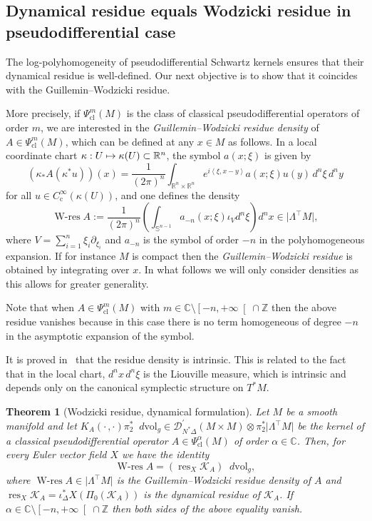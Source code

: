 \documentclass[10pt]{amsart}
\let\pazocal\mathscr
\def\mto{\mathchoice{\longmapsto}{\mapsto}{\mapsto}{\mapsto}}
\newcommand{\LtM}{\Lambda^{\!\!\top\!}M}
\newtheorem{theorem}{Theorem}[section]
\theoremstyle{definition}
\renewcommand\c{\mathrm{c}}
\newcommand{\ph}{\mathrm{cl}}
\let\cv\alpha
\let\asigma a
\let\euler X
\DeclareMathOperator{\wres}{{\scriptstyle W}-res}
\DeclareMathOperator{\resnorm}{res}
\newcommand{\resdyn}{{\resnorm_\euler}}
\newcommand*{\defeq}{:=}
\newcommand{\clopen}[1]{\mathopen{}\mathclose{\left[#1 \right[}}
\newcommand\dvol{\mathop{}\!d\mathrm{vol}}
\let\Subsection\subsection\let\Subsubsection\subsubsection
\begin{document}
\Subsection{Dynamical residue equals Wodzicki residue in pseudodifferential case}\label{ss:wodzicki}

The log-polyhomogeneity of pseudodifferential Schwartz kernels ensures that their dynamical residue is well-defined. Our next objective is to show that it coincides with the Guillemin--Wodzicki residue.

More precisely, if $\Psi^m_\ph(M)$ is the class of classical pseudodifferential operators of order $m$, we are interested in the \emph{Guillemin--Wodzicki residue density} of $A\in\Psi^m_\ph(M)$, which can be defined at any $x\in M$ as follows. In a local coordinate chart $\kappa:U\mto \kappa(U)\subset \mathbb{R}^n$, the symbol $a(x;\xi)$ is given by
\[
\left(\kappa_{*} A\left(\kappa^*u\right)\right)(x)=\frac{1}{(2\pi)^n} \int_{\mathbb{R}^n\times \mathbb{R}^n} e^{i\left\langle\xi,x-y\right\rangle}\asigma(x;\xi)u(y)\, d^n\xi\, d^ny
\]
for all $u\in C^\infty_\c\left(\kappa\left(U\right)\right)$, and one defines the density
\[
\wres A\defeq \frac{1}{(2\pi)^n}\left(\int_{\mathbb{S}^{n-1}} \asigma_{-n}(x;\xi) \iota_{V} d^n\xi\right)d^nx \in \vert\LtM \vert,
\]
where $V=\sum_{i=1}^n\xi_i\partial_{\xi_i}$ and $\asigma_{-n}$ is the symbol of order $-n$ in the polyhomogeneous expansion.
If for instance $M$ is compact then the \emph{Guillemin--Wodzicki residue} is obtained by integrating over $x$. In what follows we will only consider densities as this allows for greater generality.

Note that when $A\in \Psi_\ph^m(M)$ with $m\in \mathbb{C}\setminus \clopen{-n,+\infty}\cap \mathbb{Z}$
then the above residue vanishes because in this case there is no term homogeneous of degree $-n$ in the asymptotic expansion of the symbol.

It is proved in~\cite[Prop.\,4.5]{Lesch} that the residue density is intrinsic. This is related to the fact that in the local chart, $d^nx\,d^n\xi$ is the Liouville measure, which is intrinsic and depends only on the canonical symplectic structure on $T^*M$.

\begin{theorem}[Wodzicki residue, dynamical formulation]\label{wodzickipdo}
Let $M$ be a smooth manifold and let $K_{A}(\cdot\,,\cdot)\pi_2^*\dvol_g\in \pazocal{D}^\prime_{N^*\Delta}(M\times M)\otimes \pi_2^*\vert \LtM \vert$ be the kernel of a classical pseudodifferential operator $A\in \Psi^\cv_{\ph}(M)$ of order {$\cv\in \mathbb{C}$}.
Then, for every Euler vector field $\euler$ we have the identity
\begin{equation} \label{toprove}
\wres A= (\resdyn {\pazocal{K}_{A}}) \dvol_g,
\end{equation}
where $\wres A\in\vert\LtM \vert$ is the Guillemin--Wodzicki residue density of $A$ and $\resdyn {\pazocal{K}_{A}}=\iota_\Delta^* \euler (\Pi_0 ({\pazocal{K}_{A}}))$ is the dynamical residue of ${\pazocal{K}_{A}}$. If $\cv\in \mathbb{C}\setminus \clopen{-n,+\infty}\cap \mathbb{Z}$
then both sides of the above equality vanish.
\end{theorem}
\end{document}
